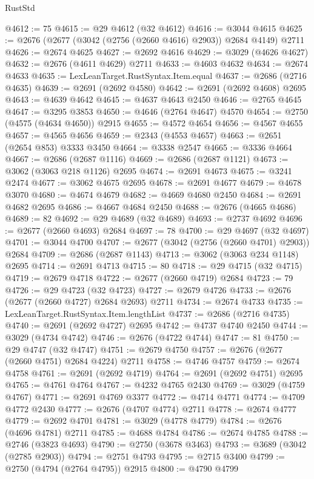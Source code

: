 \begin{lexlean}{RustStd}
\begin{coremodule}
{\begin{coremodule}
{{{{{{{{{{{{{{{{{{{{{{{{{{{{{{{{{{{{{{{{{{{{{{{{{{{{{{{@4612 := 75
@4615 := @29 @4612 (@32 @4612)
@4616 := @3044 @4615
@4625 := @2676 (@2677 (@3042 (@2756 (@2660 @4616) @2903)) @2684 @4149) @2711
@4626 := @2674 @4625
@4627 := @2692 @4616
@4629 := @3029 (@4626 @4627)
@4632 := @2676 (@4611 @4629) @2711
@4633 := @4603 @4632
@4634 := @2674 @4633
@4635 := LexLeanTarget.RustSyntax.Item.equal
@4637 := @2686 (@2716 @4635)
@4639 := @2691 (@2692 @4580)
@4642 := @2691 (@2692 @4608) @2695
@4643 := @4639 @4642
@4645 := @4637 @4643 @2450
@4646 := @2765 @4645
@4647 := @3295 @3853
@4650 := @4646 (@2764 @4647) @4570
@4654 := @2750 (@4575 (@4634 @4650)) @2915
@4655 := @4572 @4654
@4656 := @4567 @4655
@4657 := @4565 @4656
@4659 := @2343 (@4553 @4657)
@4663 := @2651 (@2654 @853) @3333 @3450
@4664 := @3338 @2547
@4665 := @3336 @4664
@4667 := @2686 (@2687 @1116)
@4669 := @2686 (@2687 @1121)
@4673 := @3062 (@3063 @218 @1126) @2695
@4674 := @2691 @4673
@4675 := @3241 @2474
@4677 := @3062 @4675 @2695
@4678 := @2691 @4677
@4679 := @4678 @3070
@4680 := @4674 @4679
@4682 := @4669 @4680 @2450
@4684 := @2691 @4682 @2695
@4686 := @4667 @4684 @2450
@4688 := @2676 (@4665 @4686)
@4689 := 82
@4692 := @29 @4689 (@32 @4689)
@4693 := @2737 @4692
@4696 := @2677 (@2660 @4693) @2684
@4697 := 78
@4700 := @29 @4697 (@32 @4697)
@4701 := @3044 @4700
@4707 := @2677 (@3042 (@2756 (@2660 @4701) @2903)) @2684
@4709 := @2686 (@2687 @1143)
@4713 := @3062 (@3063 @234 @1148) @2695
@4714 := @2691 @4713
@4715 := 80
@4718 := @29 @4715 (@32 @4715)
@4719 := @2679 @4718
@4722 := @2677 (@2660 @4719) @2684
@4723 := 79
@4726 := @29 @4723 (@32 @4723)
@4727 := @2679 @4726
@4733 := @2676 (@2677 (@2660 @4727) @2684 @2693) @2711
@4734 := @2674 @4733
@4735 := LexLeanTarget.RustSyntax.Item.lengthList
@4737 := @2686 (@2716 @4735)
@4740 := @2691 (@2692 @4727) @2695
@4742 := @4737 @4740 @2450
@4744 := @3029 (@4734 @4742)
@4746 := @2676 (@4722 @4744)
@4747 := 81
@4750 := @29 @4747 (@32 @4747)
@4751 := @2679 @4750
@4757 := @2676 (@2677 (@2660 @4751) @2684 @4224) @2711
@4758 := @4746 @4757
@4759 := @2674 @4758
@4761 := @2691 (@2692 @4719)
@4764 := @2691 (@2692 @4751) @2695
@4765 := @4761 @4764
@4767 := @4232 @4765 @2430
@4769 := @3029 (@4759 @4767)
@4771 := @2691 @4769 @3377
@4772 := @4714 @4771
@4774 := @4709 @4772 @2430
@4777 := @2676 (@4707 @4774) @2711
@4778 := @2674 @4777
@4779 := @2692 @4701
@4781 := @3029 (@4778 @4779)
@4784 := @2676 (@4696 @4781) @2711
@4785 := @4688 @4784
@4786 := @2674 @4785
@4788 := @2746 (@3823 @4693)
@4790 := @2750 (@3678 @3463)
@4793 := @3689 (@3042 (@2785 @2903))
@4794 := @2751 @4793
@4795 := @2715 @3400
@4799 := @2750 (@4794 (@2764 @4795)) @2915
@4800 := @4790 @4799
}}}}}}}}}}}}}}}}}}}}}}}}}}}}}}}}}}}}}}}}}}}}}}}}}}}}}}}
\end{coremodule}}
\end{coremodule}
\end{lexlean}
